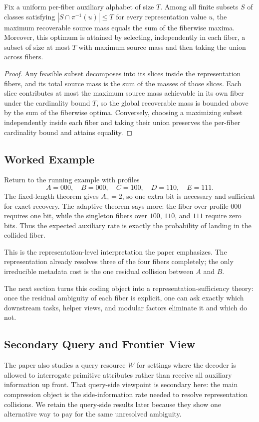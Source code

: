 \begin{proposition}\label{prop:fiberwise-decomposition}
Fix a uniform per-fiber auxiliary alphabet of size $T$. Among all finite subsets $S$ of classes satisfying $|S \cap \pi^{-1}(u)| \le T$ for every representation value $u$, the maximum recoverable source mass equals the sum of the fiberwise maxima. Moreover, this optimum is attained by selecting, independently in each fiber, a subset of size at most $T$ with maximum source mass and then taking the union across fibers.
\end{proposition}

\begin{proof}
Any feasible subset decomposes into its slices inside the representation fibers, and its total source mass is the sum of the masses of those slices. Each slice contributes at most the maximum source mass achievable in its own fiber under the cardinality bound $T$, so the global recoverable mass is bounded above by the sum of the fiberwise optima. Conversely, choosing a maximizing subset independently inside each fiber and taking their union preserves the per-fiber cardinality bound and attains equality.
\end{proof}

\subsection{Worked Example}

Return to the running example with profiles
\[
A=000,\quad B=000,\quad C=100,\quad D=110,\quad E=111.
\]
The fixed-length theorem gives $A_\pi=2$, so one extra bit is necessary and sufficient for exact recovery. The adaptive theorem says more: the fiber over profile $000$ requires one bit, while the singleton fibers over $100$, $110$, and $111$ require zero bits. Thus the expected auxiliary rate is exactly the probability of landing in the collided fiber.

This is the representation-level interpretation the paper emphasizes. The representation already resolves three of the four fibers completely; the only irreducible metadata cost is the one residual collision between $A$ and $B$.

The next section turns this coding object into a representation-sufficiency theory: once the residual ambiguity of each fiber is explicit, one can ask exactly which downstream tasks, helper views, and modular factors eliminate it and which do not.

\subsection{Secondary Query and Frontier View}

The paper also studies a query resource $W$ for settings where the decoder is allowed to interrogate primitive attributes rather than receive all auxiliary information up front. That query-side viewpoint is secondary here: the main compression object is the side-information rate needed to resolve representation collisions. We retain the query-side results later because they show one alternative way to pay for the same unresolved ambiguity.
